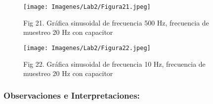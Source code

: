 \documentclass[
  letterpaper,
  DIV=11,
  numbers=noendperiod]{scrartcl}
\begin{document}
\begin{figure}[H]

{\centering \texttt{[image: Imagenes/Lab2/Figura21.jpeg]}

}

\caption{Fig 21. Gráfica sinusoidal de frecuencia 500 Hz, frecuencia de
muestreo 20 Hz con capacitor}

\end{figure}%
\begin{figure}[H]

{\centering \texttt{[image: Imagenes/Lab2/Figura22.jpeg]}

}

\caption{Fig 22. Gráfica sinusoidal de frecuencia 10 Hz, frecuencia de
muestreo 20 Hz con capacitor}

\end{figure}%

\subsubsection{Observaciones e
Interpretaciones:}\label{observaciones-e-interpretaciones}
\end{document}
